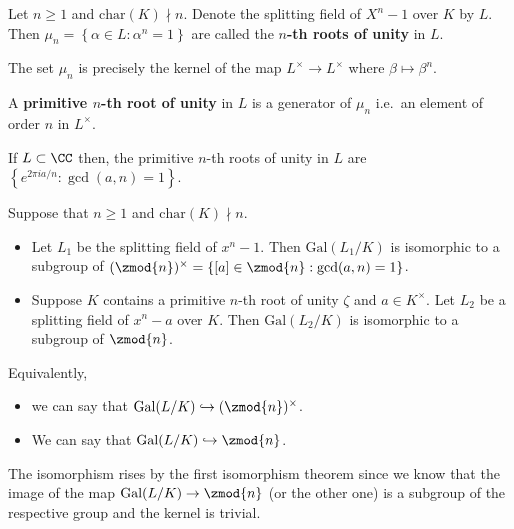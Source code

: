 \documentclass[12pt, a4paper]{article}
\newcommand{\gal}{\text{Gal}}
\begin{document}
\begin{definition}
    Let \(n\geq 1\) and \(\text{char}(K) \nmid n\). Denote the splitting field of \(X^n -1\) over \(K\) by \(L\). Then \(\mu_n = \left\{ \alpha \in L : \alpha^n =1 \right\}\) are called the \textbf{\(n\)-th roots of unity} in \(L\).
\end{definition}

\begin{mdremark}
    The set \(\mu_n\) is precisely the kernel of the map \(L^\times \to L^\times\) where \(\beta \mapsto \beta^n\). 
\end{mdremark}

\begin{definition}
    A \textbf{primitive \(n\)-th root of unity} in \(L\) is a generator of \(\mu_n\) i.e.\ an element of order \(n\) in \(L^{\times}\).
\end{definition}

\begin{mdremark}
    If \(L \subset \CC\) then, the primitive \(n\)-th roots of unity in \(L\) are \(\left\{ e^{2\pi i a/n} : \gcd(a,n)=1 \right\}\).
\end{mdremark}

\begin{mdprop}
    Suppose that \(n \geq 1\) and \(\text{char}(K) \nmid n\).
    \begin{itemize}
        \item Let \(L_1\) be the splitting field of \(x^n-1\). Then \(\gal(L_1/K)\) is isomorphic to a subgroup of \((\zmod{n})^{\times}  =\left\{ [a] \in \zmod{n} : \gcd(a,n)=1 \right\}\).
        \item Suppose \(K\) contains a primitive \(n\)-th root of unity \(\zeta\) and \(a\in K^{\times}\). Let \(L_2\) be a splitting field of \(x^n-a\) over \(K\). Then \(\gal(L_2/K)\) is isomorphic to a subgroup of \(\zmod{n}\).
    \end{itemize}
\end{mdprop}

\begin{mdremark}
    Equivalently,
    \begin{itemize}
        \item we can say that \(\gal(L/K) \hookrightarrow (\zmod{n})^{\times}\).
        \item We can say that \(\gal(L/K) \hookrightarrow \zmod{n}\).
    \end{itemize}
    The isomorphism rises by the first isomorphism theorem since we know that the image of the map \(\gal(L/K) \to \zmod{n}\) (or the other one) is a subgroup of the respective group and the kernel is trivial.
\end{mdremark}
\end{document}
